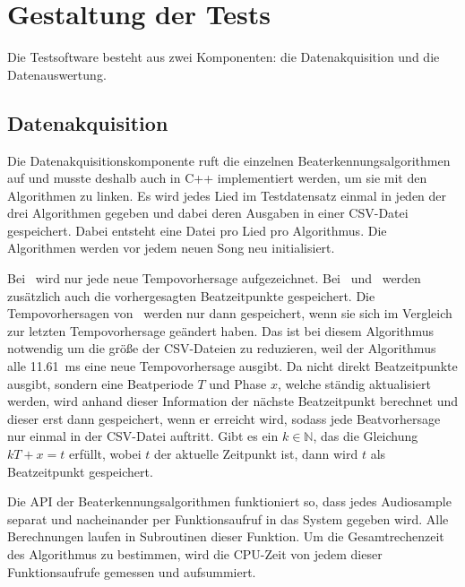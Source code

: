\section{Gestaltung der Tests} \label{konzept/gestaltung}
{
	Die Testsoftware besteht aus zwei Komponenten:
		die Datenakquisition und die Datenauswertung.

	\subsection{Datenakquisition}
	{
		Die Datenakquisitionskomponente ruft die einzelnen Beaterkennungsalgorithmen auf
			und musste deshalb auch in C++ implementiert werden,
			um sie mit den Algorithmen zu linken.
		Es wird jedes Lied im Testdatensatz einmal in jeden der drei Algorithmen gegeben
			und dabei deren Ausgaben in einer CSV-Datei gespeichert.
		Dabei entsteht eine Datei pro Lied pro Algorithmus.
		Die Algorithmen werden vor jedem neuen Song neu initialisiert.

		Bei~\cite{2001_BeatThis} wird nur jede neue Tempovorhersage aufgezeichnet.
		Bei~\cite{2009_DaPlSt} und~\cite{2011_PlRoSt} werden zusätzlich auch die vorhergesagten Beatzeitpunkte gespeichert.
		Die Tempovorhersagen von~\cite{2011_PlRoSt} werden nur dann gespeichert,
			wenn sie sich im Vergleich zur letzten Tempovorhersage geändert haben.
		Das ist bei diesem Algorithmus notwendig um die größe der CSV-Dateien zu reduzieren,
			weil der Algorithmus alle \SI{11.61}{\milli\second} eine neue Tempovorhersage ausgibt.
		Da \cite{2011_PlRoSt} nicht direkt Beatzeitpunkte ausgibt,
			sondern eine Beatperiode $T$ und Phase $x$,
			welche ständig aktualisiert werden,
			wird anhand dieser Information der nächste Beatzeitpunkt berechnet
			und dieser erst dann gespeichert,
			wenn er erreicht wird,
			sodass jede Beatvorhersage nur einmal in der CSV-Datei auftritt.
		Gibt es ein $k \in \mathbb{N}$, das die Gleichung $kT + x = t$ erfüllt,
			wobei $t$ der aktuelle Zeitpunkt ist,
			dann wird $t$ als Beatzeitpunkt gespeichert.

		Die API der Beaterkennungsalgorithmen funktioniert so,
			dass jedes Audiosample separat und nacheinander per Funktionsaufruf in das System gegeben wird.
		Alle Berechnungen laufen in Subroutinen dieser Funktion.
		Um die Gesamtrechenzeit des Algorithmus zu bestimmen,
			wird die CPU-Zeit von jedem dieser Funktionsaufrufe gemessen und aufsummiert.
	}

}
